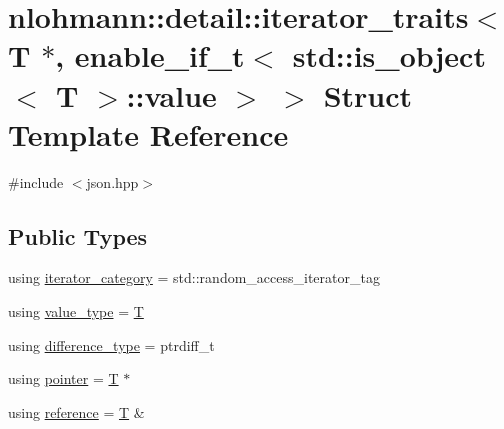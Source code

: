 \hypertarget{structnlohmann_1_1detail_1_1iterator__traits_3_01_t_01_5_00_01enable__if__t_3_01std_1_1is__objec8d960665487688165530972cda4f1bea}{}\section{nlohmann\+::detail\+::iterator\+\_\+traits$<$ T $\ast$, enable\+\_\+if\+\_\+t$<$ std\+::is\+\_\+object$<$ T $>$\+::value $>$ $>$ Struct Template Reference}
\label{structnlohmann_1_1detail_1_1iterator__traits_3_01_t_01_5_00_01enable__if__t_3_01std_1_1is__objec8d960665487688165530972cda4f1bea}


{\ttfamily \#include $<$json.\+hpp$>$}

\subsection*{Public Types}
\begin{DoxyCompactItemize}
\item 
using \mbox{\hyperlink{structnlohmann_1_1detail_1_1iterator__traits_3_01_t_01_5_00_01enable__if__t_3_01std_1_1is__objec8d960665487688165530972cda4f1bea_a9b043cfe0fdfb3e9665428fb2be9cea1}{iterator\+\_\+category}} = std\+::random\+\_\+access\+\_\+iterator\+\_\+tag
\item 
using \mbox{\hyperlink{structnlohmann_1_1detail_1_1iterator__traits_3_01_t_01_5_00_01enable__if__t_3_01std_1_1is__objec8d960665487688165530972cda4f1bea_a443e6a62f5fb2c545fc71c751b98ca8d}{value\+\_\+type}} = \mbox{\hyperlink{_keyboard_event_8h_adf1f3edb9115acb0a1e04209b7a9937b}{T}}
\item 
using \mbox{\hyperlink{structnlohmann_1_1detail_1_1iterator__traits_3_01_t_01_5_00_01enable__if__t_3_01std_1_1is__objec8d960665487688165530972cda4f1bea_ae7be99eb434f5b5f34692874c272b759}{difference\+\_\+type}} = ptrdiff\+\_\+t
\item 
using \mbox{\hyperlink{structnlohmann_1_1detail_1_1iterator__traits_3_01_t_01_5_00_01enable__if__t_3_01std_1_1is__objec8d960665487688165530972cda4f1bea_a33ee9a1beb8ee099f989fd4af15178a5}{pointer}} = \mbox{\hyperlink{_keyboard_event_8h_adf1f3edb9115acb0a1e04209b7a9937b}{T}} $\ast$
\item 
using \mbox{\hyperlink{structnlohmann_1_1detail_1_1iterator__traits_3_01_t_01_5_00_01enable__if__t_3_01std_1_1is__objec8d960665487688165530972cda4f1bea_a0809c5949d22f08a993231d2fdf285f0}{reference}} = \mbox{\hyperlink{_keyboard_event_8h_adf1f3edb9115acb0a1e04209b7a9937b}{T}} \&
\end{DoxyCompactItemize}


